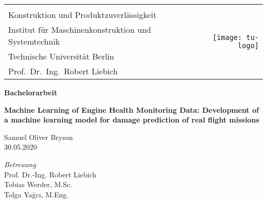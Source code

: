 
\begin{titlepage}

   {\footnotesize
   \begin{tabular}{l r}
      & \multirow{5}{*}{\hspace{5em}\texttt{[image: tu-logo]}} \\
      Konstruktion und Produktzuverl\"assigkeit \\
      Institut f\"ur Maschinenkonstruktion und Systemtechnik \\
      Technische Universit\"at Berlin \\
      Prof.~Dr.~Ing.~Robert Liebich \\
   \end{tabular}}

   {\centering

   \vspace{4.5cm}
   {\LARGE\bfseries Bachelorarbeit\par}
   \vspace{1.5cm}
   {\Large \textbf{Machine Learning of Engine Health Monitoring Data: Development of a machine learning model for damage prediction of real flight missions}\par}
   \vspace{1cm}

   \vspace{1cm}
   {\Large Samuel Oliver Bryson} \\
   \vspace{0.5cm}
   {\large 30.05.2020} \\}

   \vspace{3.5cm}
   \large{\textit{Betreuung}} \vspace{0.5cm} \\
   Prof. Dr.-Ing. Robert Liebich \\
   Tobias Werder, M.Sc. \\
   Tolga Ya\u{g}c\i{}, M.Eng. \\

\end{titlepage}